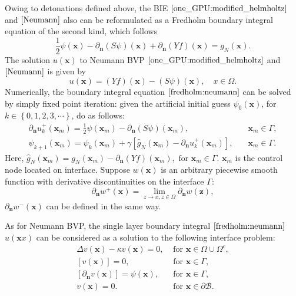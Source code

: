 Owing to detonations defined above, the BIE $\eqref{one_GPU:modified_helmholtz}$ and $\eqref{Neumann}$ also can be reformulated as a Fredholm boundary integral equation of the second kind\cite{kress1989linear,hsiao2008boundary}, which follows
\begin{equation}
    \frac{1}{2}\psi(\mathbf{x}) -\partial_{\mathbf{n}} (S\psi)(\mathbf{x}) + \partial_{\mathbf{n}} (Yf)(\mathbf{x}) = g_{N}(\mathbf{x}).
    \label{fredholm:neumann}
\end{equation}
The solution $u(\mathbf{x})$ to Neumann BVP $\eqref{one_GPU:modified_helmholtz}$ and $\eqref{Neumann}$ is given by 
\begin{equation}
    u(\mathbf{x}) = (Yf)(\mathbf{x}) - (S\psi)(\mathbf{x}), \quad x \in \Omega.
\end{equation}
Numerically, the boundary integral equation $\eqref{fredholm:neumann}$ can be solved by simply fixed point iteration: given the artificial initial guess $\psi_{0}(\mathbf{x})$, for $k \in \left\{0, 1, 2, 3, \cdots \right\}$, do as follows:
\begin{align}
    \partial_{\mathbf{n}} u_{k}^{+}(\mathbf{x}_{m}) = \frac{1}{2}\psi(\mathbf{x}_{m}) - \partial_{\mathbf{n}}(S\psi)(\mathbf{x}_{m}), & \quad \mathbf{x}_{m} \in \Gamma,\label{neumann:richardson1} \\
    \psi_{k+1}(\mathbf{x}_{m}) = \psi_{k}(\mathbf{x}_{m}) + \gamma[\hat{g}_{N}(\mathbf{x}_{m}) - \partial_{\mathbf{n}} u_{k}^{+}(\mathbf{x}_{m})], & \quad \mathbf{x}_{m} \in \Gamma.\label{neumann:richardson2}
\end{align}
Here, $\hat{g}_{N}(\mathbf{x}_{m}) = g_{N}(\mathbf{x}_{m})-\partial_{\mathbf{n}}(Yf)(\mathbf{x}_{m}),\text{ for } \mathbf{x}_{m} \in \Gamma$. $\mathbf{x}_{m}$ is the control node located on interface. Suppose $w(\mathbf{x})$ is an arbitrary piecewise smooth function with derivative  discontinuities on the interface $\Gamma$: 
\begin{equation}
    \partial_{\mathbf{n}} w^{+}(\mathbf{x}) = \lim_{z \longrightarrow x, z \in \Omega} \partial _{\mathbf{n}} w(\mathbf{z}),
\end{equation}
$\partial_{\mathbf{n}} w^{-}(\mathbf{x})$ can be defined in the same way. 

As for Neumann BVP, the single layer boundary integral $\eqref{fredholm:neumann}$  $u(\mathbf{x}{x})$ can be considered as a solution to the following interface problem:
\begin{equation}
\begin{array}{ll}
\Delta v(\mathbf{x})-\kappa v(\mathbf{x})=0, &\text { for } \mathbf{x} \in \Omega \cup \Omega^{c},\\
{[v(\mathbf{x})]=0}, & \text { for } \mathbf{x} \in \Gamma,\\
{\left[\partial_{\mathbf{n}} v(\mathbf{x})\right]=\psi(\mathbf{x})}, & \text { for } \mathbf{x} \in \Gamma,\\
v(\mathbf{x})=0. & \text { for } \mathbf{x} \in \partial \mathcal{B}.
\end{array}
\label{single:interface}
\end{equation}

